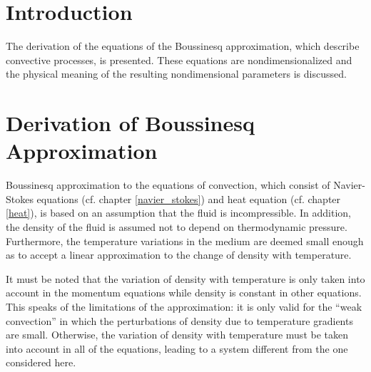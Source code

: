\providecommand{\partialTimeTemp}{\partial_t\theta}
\providecommand{\inertTermTemp}{(\velocity\nabla)\theta}
\providecommand{\tempGrad}{\nabla \theta}
\providecommand{\laplacianTemp}{\Delta\theta}


\providecommand{\divergenceNondim}{\nabla^{\prime}\cdot}

\providecommand{\velocityNondim}{\mathbf{v^{\prime}}}

\providecommand{\substDerivVelNondim}{\frac{D\velocity^{\prime}}{dt^{\prime}}}
\providecommand{\partialTimeVelNondim}{\partial_{t^{\prime}}\velocity^{\prime}}
\providecommand{\inertTermVelNondim}{(\velocity^{\prime}\nabla^{\prime})\velocity^{\prime}}

\providecommand{\velocityPressureTensorNondim}{\partial_l^{\prime}v^{k \prime}\partial_k^{\prime}v^{l \prime}}

\providecommand{\pressGradNondim}{\nabla^{\prime} p^{\prime}}
\providecommand{\pressLaplacianNondim}{\Delta^{\prime} p^{\prime}}
\providecommand{\laplacianVelNondim}{\Delta^{\prime}\velocity^{\prime}}

\section{Introduction}

The derivation of the equations of the Boussinesq approximation, which describe convective processes, is presented. These equations are nondimensionalized and the physical meaning of the resulting nondimensional parameters is discussed.
 
\section{Derivation of Boussinesq Approximation}

Boussinesq approximation to the equations of convection, which consist of Navier-Stokes equations (cf. chapter \ref{navier_stokes}) and heat equation (cf. chapter \ref{heat}), is based on an assumption that the fluid is incompressible. In addition, the density of the fluid is assumed not to depend on thermodynamic pressure. Furthermore, the temperature variations in the medium are deemed small enough as to accept a linear approximation to the change of density with temperature. 

It must be noted that the variation of density with temperature is only taken into account in the momentum equations while density is constant in other equations. This speaks of the limitations of the approximation: it is only valid for the ``weak convection'' in which the perturbations of density due to temperature gradients are small. Otherwise, the variation of density with temperature must be taken into account in all of the equations, leading to a system different from the one considered here.

